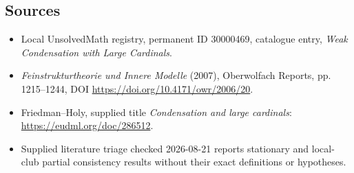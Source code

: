 \documentclass[11pt]{article}
\begin{document}
\subsection{Sources}
\begin{itemize}
\item Local UnsolvedMath registry, permanent ID 30000469, catalogue entry, \emph{Weak Condensation with Large Cardinals}.
\item \emph{Feinstrukturtheorie und Innere Modelle} (2007), Oberwolfach Reports, pp. 1215--1244, DOI \url{https://doi.org/10.4171/owr/2006/20}.
\item Friedman--Holy, supplied title \emph{Condensation and large cardinals}: \url{https://eudml.org/doc/286512}.
\item Supplied literature triage checked 2026-08-21 reports stationary and local-club partial consistency results without their exact definitions or hypotheses.
\end{itemize}
\end{document}
